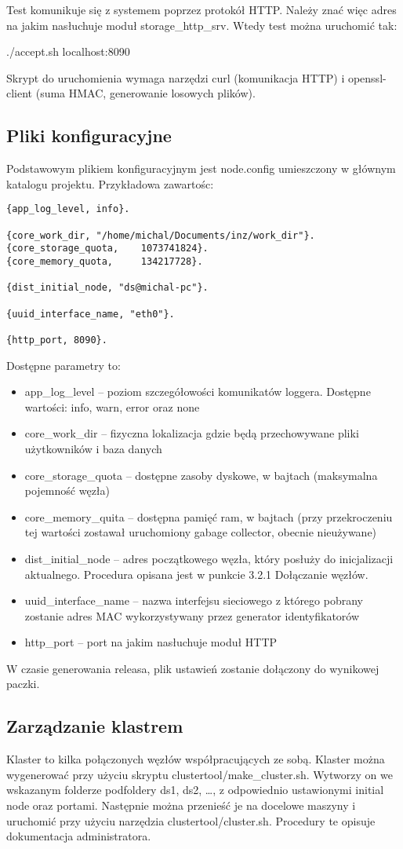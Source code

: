 Test komunikuje się z systemem poprzez protokół HTTP. Należy znać więc adres na jakim nasłuchuje moduł storage\_http\_srv. Wtedy test można uruchomić tak:

./accept.sh localhost:8090

Skrypt do uruchomienia wymaga narzędzi curl (komunikacja HTTP) i openssl-client (suma HMAC, generowanie losowych plików).


\subsection{Pliki konfiguracyjne}
Podstawowym plikiem konfiguracyjnym jest node.config umieszczony w głównym katalogu projektu. Przykładowa zawartośc:
\begin{lstlisting}
{app_log_level, info}.

{core_work_dir, "/home/michal/Documents/inz/work_dir"}.
{core_storage_quota,	1073741824}.
{core_memory_quota,		134217728}.

{dist_initial_node, "ds@michal-pc"}.

{uuid_interface_name, "eth0"}.

{http_port, 8090}.
\end{lstlisting}

Dostępne parametry to:
\begin{itemize}
	\item app\_log\_level – poziom szczegółowości komunikatów loggera. Dostępne wartości: info, warn, error oraz none
	\item core\_work\_dir – fizyczna lokalizacja gdzie będą przechowywane pliki użytkowników i baza danych 
	\item core\_storage\_quota – dostępne zasoby dyskowe, w bajtach (maksymalna pojemność węzła)
	\item core\_memory\_quita – dostępna pamięć ram, w bajtach (przy przekroczeniu tej wartości zostawał uruchomiony gabage collector, obecnie nieużywane)
	\item dist\_initial\_node – adres początkowego węzła, który posłuży do inicjalizacji aktualnego. Procedura opisana jest w punkcie 3.2.1  Dołączanie węzłów.
	\item uuid\_interface\_name – nazwa interfejsu sieciowego z którego pobrany zostanie adres MAC wykorzystywany przez generator identyfikatorów
	\item http\_port – port na jakim nasłuchuje moduł HTTP
\end{itemize}

W czasie generowania releasa, plik ustawień zostanie dołączony do wynikowej paczki.



\subsection{Zarządzanie klastrem}
Klaster to kilka połączonych węzłów współpracujących ze sobą. Klaster można wygenerować przy użyciu skryptu clustertool/make\_cluster.sh. Wytworzy on we wskazanym folderze podfoldery ds1, ds2, …, z odpowiednio ustawionymi initial node oraz portami. Następnie można przenieść je na docelowe maszyny i uruchomić przy użyciu narzędzia clustertool/cluster.sh.
Procedury te opisuje dokumentacja administratora.
